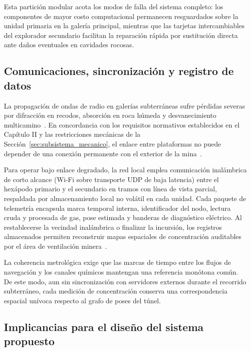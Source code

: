 Esta partición modular acota los modos de falla del sistema completo: los componentes de mayor costo computacional permanecen resguardados sobre la unidad primaria en la galería principal, mientras que las tarjetas intercambiables del explorador secundario facilitan la reparación rápida por sustitución directa ante daños eventuales en cavidades rocosas.

\subsection{Comunicaciones, sincronización y registro de datos}

La propagación de ondas de radio en galerías subterráneas sufre pérdidas severas por difracción en recodos, absorción en roca húmeda y desvanecimiento multicamino~\cite{Obosu2025_Automation}. En concordancia con los requisitos normativos establecidos en el Capítulo II y las restricciones mecánicas de la Sección~\ref{sec:subsistema_mecanico}, el enlace entre plataformas no puede depender de una conexión permanente con el exterior de la mina~\cite{OSINERGMIN_BoletinGSM_2020, MINEM_DS024_2016}.

Para operar bajo enlace degradado, la red local emplea comunicación inalámbrica de corto alcance (Wi-Fi sobre transporte UDP de baja latencia) entre el hexápodo primario y el secundario en tramos con línea de vista parcial, respaldada por almacenamiento local no volátil en cada unidad. Cada paquete de telemetría encapsula marca temporal interna, identificador del nodo, lectura cruda y procesada de gas, pose estimada y banderas de diagnóstico eléctrico. Al restablecerse la vecindad inalámbrica o finalizar la incursión, los registros almacenados permiten reconstruir mapas espaciales de concentración auditables por el área de ventilación minera~\cite{OSINERGMIN_BoletinGSM_Ventilacion_2020, EU_ExposureDirective_2020}.

La coherencia metrológica exige que las marcas de tiempo entre los flujos de navegación y los canales químicos mantengan una referencia monótona común. De este modo, aun sin sincronización con servidores externos durante el recorrido subterráneo, cada medición de concentración conserva una correspondencia espacial unívoca respecto al grafo de poses del túnel.

\subsection{Implicancias para el diseño del sistema propuesto}

